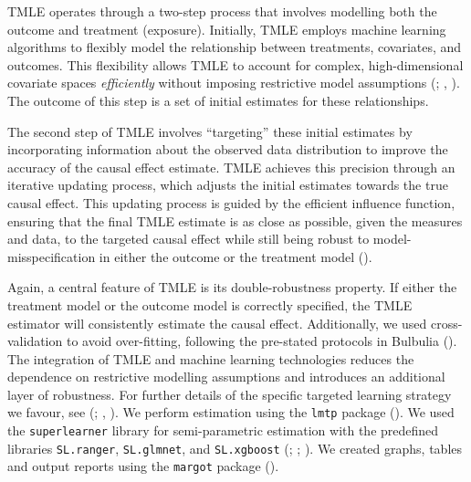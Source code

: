 \documentclass[
  single column]{article}
\begin{document}
TMLE operates through a two-step process that involves modelling both
the outcome and treatment (exposure). Initially, TMLE employs machine
learning algorithms to flexibly model the relationship between
treatments, covariates, and outcomes. This flexibility allows TMLE to
account for complex, high-dimensional covariate spaces
\emph{efficiently} without imposing restrictive model assumptions
(;
,
). The outcome of this step is a set
of initial estimates for these relationships.

The second step of TMLE involves ``targeting'' these initial estimates
by incorporating information about the observed data distribution to
improve the accuracy of the causal effect estimate. TMLE achieves this
precision through an iterative updating process, which adjusts the
initial estimates towards the true causal effect. This updating process
is guided by the efficient influence function, ensuring that the final
TMLE estimate is as close as possible, given the measures and data, to
the targeted causal effect while still being robust to
model-misspecification in either the outcome or the treatment model
().

Again, a central feature of TMLE is its double-robustness property. If
either the treatment model or the outcome model is correctly specified,
the TMLE estimator will consistently estimate the causal effect.
Additionally, we used cross-validation to avoid over-fitting, following
the pre-stated protocols in Bulbulia
(). The integration of TMLE
and machine learning technologies reduces the dependence on restrictive
modelling assumptions and introduces an additional layer of robustness.
For further details of the specific targeted learning strategy we
favour, see (;
,
). We perform estimation using the
\texttt{lmtp} package (). We used the \texttt{superlearner} library for semi-parametric
estimation with the predefined libraries \texttt{SL.ranger},
\texttt{SL.glmnet}, and \texttt{SL.xgboost}
(;
;
). We created graphs,
tables and output reports using the \texttt{margot} package
().
\end{document}
